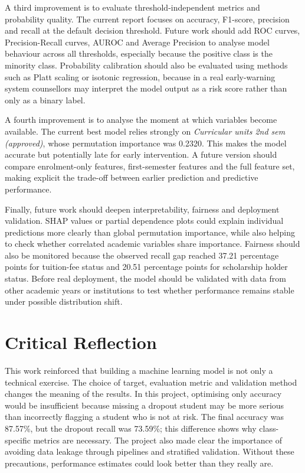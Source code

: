 \documentclass[conference]{IEEEtran}
\begin{document}
A third improvement is to evaluate threshold-independent metrics and probability quality. The current report focuses on accuracy, F1-score, precision and recall at the default decision threshold. Future work should add ROC curves, Precision-Recall curves, AUROC and Average Precision to analyse model behaviour across all thresholds, especially because the positive class is the minority class. Probability calibration should also be evaluated using methods such as Platt scaling or isotonic regression, because in a real early-warning system counsellors may interpret the model output as a risk score rather than only as a binary label.

A fourth improvement is to analyse the moment at which variables become available. The current best model relies strongly on \textit{Curricular units 2nd sem (approved)}, whose permutation importance was 0.2320. This makes the model accurate but potentially late for early intervention. A future version should compare enrolment-only features, first-semester features and the full feature set, making explicit the trade-off between earlier prediction and predictive performance.

Finally, future work should deepen interpretability, fairness and deployment validation. SHAP values or partial dependence plots could explain individual predictions more clearly than global permutation importance, while also helping to check whether correlated academic variables share importance. Fairness should also be monitored because the observed recall gap reached 37.21 percentage points for tuition-fee status and 20.51 percentage points for scholarship holder status. Before real deployment, the model should be validated with data from other academic years or institutions to test whether performance remains stable under possible distribution shift.

\section{Critical Reflection}
This work reinforced that building a machine learning model is not only a technical exercise. The choice of target, evaluation metric and validation method changes the meaning of the results. In this project, optimising only accuracy would be insufficient because missing a dropout student may be more serious than incorrectly flagging a student who is not at risk. The final accuracy was 87.57\%, but the dropout recall was 73.59\%; this difference shows why class-specific metrics are necessary. The project also made clear the importance of avoiding data leakage through pipelines and stratified validation. Without these precautions, performance estimates could look better than they really are.
\end{document}
